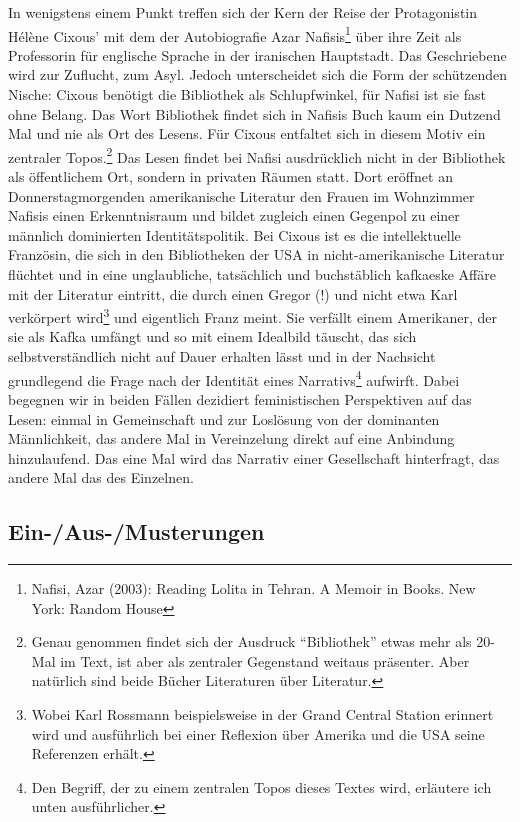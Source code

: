 \documentclass[output=paper]{langscibook}
\begin{document}
In wenigstens einem Punkt treffen sich der Kern der Reise der
Protagonistin Hélène Cixous' mit dem der Autobiografie Azar
Nafisis\footnote{Nafisi, Azar (2003): Reading Lolita in Tehran. A Memoir
  in Books. New York: Random House} über ihre Zeit als Professorin für
englische Sprache in der iranischen Hauptstadt. Das Geschriebene wird
zur Zuflucht, zum Asyl. Jedoch unterscheidet sich die Form der
schützenden Nische: Cixous benötigt die Bibliothek als Schlupfwinkel,
für Nafisi ist sie fast ohne Belang. Das Wort Bibliothek findet sich in
Nafisis Buch kaum ein Dutzend Mal und nie als Ort des Lesens. Für Cixous
entfaltet sich in diesem Motiv ein zentraler Topos.\footnote{Genau
  genommen findet sich der Ausdruck \enquote{Bibliothek} etwas mehr als
  20-Mal im Text, ist aber als zentraler Gegenstand weitaus präsenter.
  Aber natürlich sind beide Bücher Literaturen über Literatur.} Das
Lesen findet bei Nafisi ausdrücklich nicht in der Bibliothek als
öffentlichem Ort, sondern in privaten Räumen statt. Dort eröffnet an
Donnerstagmorgenden amerikanische Literatur den Frauen im Wohnzimmer
Nafisis einen Erkenntnisraum und bildet zugleich einen Gegenpol zu einer
männlich dominierten Identitätspolitik. Bei Cixous ist es die
intellektuelle Französin, die sich in den Bibliotheken der USA in
nicht-amerikanische Literatur flüchtet und in eine unglaubliche,
tatsächlich und buchstäblich kafkaeske Affäre mit der Literatur
eintritt, die durch einen Gregor (!) und nicht etwa Karl verkörpert
wird\footnote{Wobei Karl Rossmann beispielsweise in der Grand Central
  Station erinnert wird und ausführlich bei einer Reflexion über Amerika
  und die USA seine Referenzen erhält.} und eigentlich Franz meint. Sie
verfällt einem Amerikaner, der sie als Kafka umfängt und so mit einem
Idealbild täuscht, das sich selbstverständlich nicht auf Dauer erhalten
lässt und in der Nachsicht grundlegend die Frage nach der Identität
eines Narrativs\footnote{Den Begriff, der zu einem zentralen Topos
  dieses Textes wird, erläutere ich unten ausführlicher.} aufwirft.
Dabei begegnen wir in beiden Fällen dezidiert feministischen
Perspektiven auf das Lesen: einmal in Gemeinschaft und zur Loslösung von
der dominanten Männlichkeit, das andere Mal in Vereinzelung direkt auf
eine Anbindung hinzulaufend. Das eine Mal wird das Narrativ einer
Gesellschaft hinterfragt, das andere Mal das des Einzelnen.

\hypertarget{ein-aus-musterungen}{%
\subsection*{Ein-/Aus-/Musterungen}\label{ein-aus-musterungen}}
\end{document}
